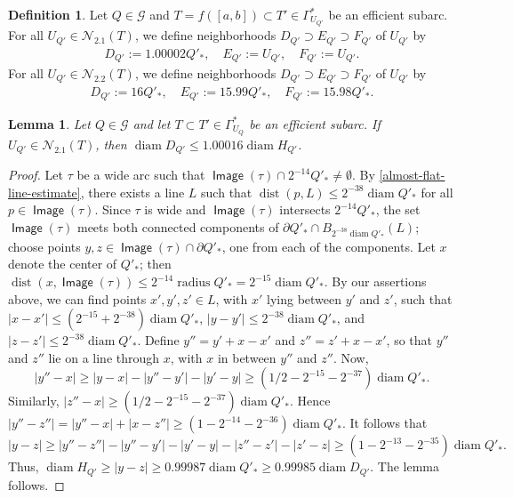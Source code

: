 \documentclass[12pt]{amsart}
\numberwithin{equation}{section}
\theoremstyle{plain}
\newtheorem{lemma}[theorem]{Lemma}
\theoremstyle{definition}
\newtheorem{definition}[theorem]{Definition}
\newcommand{\radius}{\mathop\mathrm{radius}\nolimits}
\newcommand{\diam}{\mathop\mathrm{diam}\nolimits}
\newcommand{\dist}{\mathop\mathrm{dist}\nolimits}
\newcommand{\Image}{\mathop\mathsf{Image}\nolimits}
\numberwithin{figure}{section}
\begin{document}
\begin{definition}\label{d:E, E-star N2 def}
Let $Q\in\mathscr{G}$ and $T=f([a,b])\subset T'\in\Gamma^*_{U_{Q'}}$ be an efficient subarc.  For all $U_{Q'}\in\mathcal{N}_{2.1}(T)$, we define neighborhoods $D_{Q'}\supset E_{Q'}\supset F_{Q'}$ of $U_{Q'}$ by
\begin{align*}
    D_{Q'} := 1.00002Q'_*, \quad E_{Q'} := U_{Q'}, \quad F_{Q'} := U_{Q'}.
\end{align*}
For all $U_{Q'}\in\mathcal{N}_{2.2}(T)$, we define neighborhoods $D_{Q'}\supset E_{Q'}\supset F_{Q'}$ of $U_{Q'}$ by
\begin{align*}
    D_{Q'} := 16Q'_*, \quad     E_{Q'} := 15.99Q'_*, \quad F_{Q'} := 15.98Q'_*.
\end{align*}
\end{definition}

\begin{lemma}\label{N21-auxiliary}
Let $Q\in\mathscr{G}$ and let $T\subset T'\in\Gamma^*_{U_Q}$ be an efficient subarc. If $U_{Q'}\in\mathcal{N}_{2.1}(T)$, then $\diam D_{Q'} \le 1.00016 \diam H_{Q'}$.
\end{lemma}

\begin{proof}
Let $\tau$ be a wide arc such that $\Image(\tau)\cap 2^{-14}Q'_*\neq\emptyset$.  By \eqref{almost-flat-line-estimate}, there exists a line $L$ such that $\dist(p,L)\leq 2^{-38}\diam Q'_*$ for all $p\in\Image(\tau)$. Since $\tau$ is wide and $\Image(\tau)$ intersects $2^{-14}Q'_*$, the set $\Image(\tau)$ meets both connected components of $\partial Q'_*\cap B_{2^{-38}\diam Q'_*}(L)$; choose points $y,z\in\Image(\tau)\cap \partial Q'_*$, one from each of the components. Let $x$ denote the center of $Q'_*$; then $\dist(x,\Image(\tau))\leq 2^{-14}\radius Q'_*=2^{-15}\diam Q'_*$. By our assertions above, we can find points $x',y',z'\in L$, with $x'$ lying between $y'$ and $z'$, such that $|x-x'| \leq (2^{-15}+2^{-38})\diam Q'_*$, $|y-y'| \leq 2^{-38}\diam Q'_*$, and $|z-z'|\leq 2^{-38}\diam Q'_*$. Define $y''=y'+x-x'$ and $z''=z'+x-x'$, so that $y''$ and $z''$ lie on a line through $x$, with $x$ in between $y''$ and $z''$. Now, $$|y''-x|\geq |y-x|-|y''-y'|-|y'-y|\geq (1/2-2^{-15}-2^{-37})\diam Q'_*.$$ Similarly, $|z''-x|\geq (1/2-2^{-15}-2^{-37})\diam Q'_*$. Hence $|y''-z''|=|y''-x|+|x-z''|\geq (1-2^{-14}-2^{-36})\diam Q'_*$. It follows that $$|y-z|\geq |y''-z''|-|y''-y'|-|y'-y|-|z''-z'|-|z'-z|\geq (1-2^{-13}-2^{-35})\diam Q'_*.$$ Thus, $\diam H_{Q'}\geq |y-z| \geq 0.99987\diam Q'_*\geq 0.99985\diam D_{Q'}$. The lemma follows.\end{proof}
\end{document}
